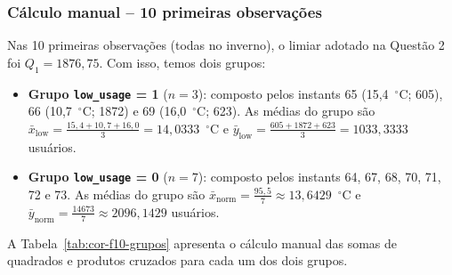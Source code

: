 \documentclass[10pt, a4paper]{article}
\begin{document}
\subsubsection{Cálculo manual -- 10 primeiras observações}

Nas 10 primeiras observações (todas no inverno), o limiar adotado na Questão 2 foi $Q_1 = 1876{,}75$. Com isso, temos dois grupos:
\begin{itemize}
    \item \textbf{Grupo \texttt{low\_usage} = 1} ($n = 3$): composto pelos instants 65 (15,4~$^\circ$C; 605), 66 (10,7~$^\circ$C; 1872) e 69 (16,0~$^\circ$C; 623). As médias do grupo são $\bar{x}_{\text{low}} = \frac{15{,}4 + 10{,}7 + 16{,}0}{3} = 14{,}0333$~$^\circ$C e $\bar{y}_{\text{low}} = \frac{605 + 1872 + 623}{3} = 1033{,}3333$ usuários.
    
    \item \textbf{Grupo \texttt{low\_usage} = 0} ($n = 7$): composto pelos instants 64, 67, 68, 70, 71, 72 e 73. As médias do grupo são $\bar{x}_{\text{norm}} = \frac{95{,}5}{7} \approx 13{,}6429$~$^\circ$C e $\bar{y}_{\text{norm}} = \frac{14673}{7} \approx 2096{,}1429$ usuários.
\end{itemize}

A Tabela~\ref{tab:cor-f10-grupos} apresenta o cálculo manual das somas de quadrados e produtos cruzados para cada um dos dois grupos.
\end{document}

